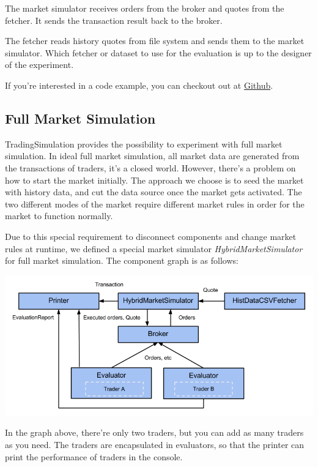 The market simulator receives orders from the broker and quotes from the fetcher. It sends the transaction result back to the broker.

The fetcher reads history quotes from file system and sends them to the market simulator. Which fetcher or dataset to use for the evaluation is up to the designer of the experiment.

If you're interested in a code example, you can checkout out at \href{https://github.com/merlinND/TradingSimulation/blob/master/ts/src/main/scala/ch/epfl/ts/evaluation/EvaluationRunner.scala}{Github}.

\subsection{Full Market Simulation}

TradingSimulation provides the possibility to experiment with full market simulation. In ideal full market simulation, all market data are generated from the transactions of traders, it's a closed world. However, there's a problem on how to start the market initially. The approach we choose is to seed the market with history data, and cut the data source once the market gets activated. The two different modes of the market require different market rules in order for the market to function normally.

Due to this special requirement to disconnect components and change market rules at runtime, we defined a special market simulator \emph{HybridMarketSimulator} for full market simulation. The component graph is as follows:

\noindent
\includegraphics[width=\textwidth]{img/examples/full-simulation}

In the graph above, there're only two traders, but you can add as many traders as you need. The traders are encapsulated in evaluators, so that the printer can print the performance of traders in the console.


